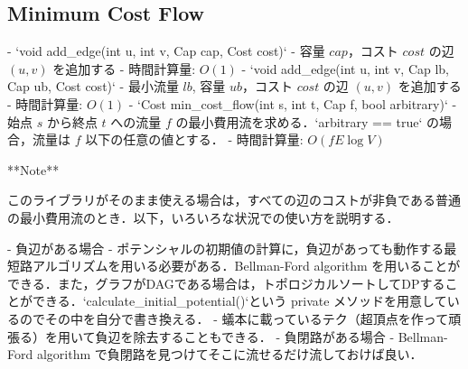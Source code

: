 \subsection{Minimum Cost Flow}

\begin{small}
\begin{markdown}
- `void add\_edge(int u, int v, Cap cap, Cost cost)`
    - 容量 $cap$，コスト $cost$ の辺 $(u, v)$ を追加する
    - 時間計算量: $O(1)$
- `void add\_edge(int u, int v, Cap lb, Cap ub, Cost cost)`
    - 最小流量 $lb$, 容量 $ub$，コスト $cost$ の辺 $(u, v)$ を追加する
    - 時間計算量: $O(1)$
- `Cost min\_cost\_flow(int s, int t, Cap f, bool arbitrary)`
    - 始点 $s$ から終点 $t$ への流量 $f$ の最小費用流を求める．`arbitrary == true` の場合，流量は $f$ 以下の任意の値とする．
    - 時間計算量: $O(fE\log V)$

**Note**

このライブラリがそのまま使える場合は，すべての辺のコストが非負である普通の最小費用流のとき．以下，いろいろな状況での使い方を説明する．

- 負辺がある場合
    - ポテンシャルの初期値の計算に，負辺があっても動作する最短路アルゴリズムを用いる必要がある．Bellman-Ford algorithm を用いることができる．また，グラフがDAGである場合は，トポロジカルソートしてDPすることができる．`calculate\_initial\_potential()`という private メソッドを用意しているのでその中を自分で書き換える．
    - 蟻本に載っているテク（超頂点を作って頑張る）を用いて負辺を除去することもできる．
- 負閉路がある場合
    - Bellman-Ford algorithm で負閉路を見つけてそこに流せるだけ流しておけば良い．
\end{markdown}
\end{small}

